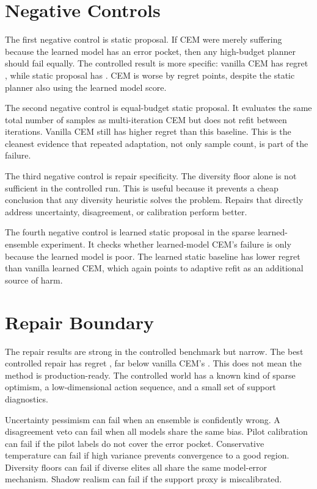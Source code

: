 \section{Negative Controls}
\label{app:negative-controls}

The first negative control is static proposal. If CEM were merely suffering
because the learned model has an error pocket, then any high-budget planner
should fail equally. The controlled result is more specific: vanilla CEM has
regret \VFourCEMRegret{}, while static proposal has
\VFourStaticRegret{}. CEM is worse by \VFourCEMMinusStatic{} regret points,
despite the static planner also using the learned model score.

The second negative control is equal-budget static proposal. It evaluates the
same total number of samples as multi-iteration CEM but does not refit between
iterations. Vanilla CEM still has higher regret than this baseline. This is
the cleanest evidence that repeated adaptation, not only sample count, is part
of the failure.

The third negative control is repair specificity. The diversity floor alone is
not sufficient in the controlled run. This is useful because it prevents a
cheap conclusion that any diversity heuristic solves the problem. Repairs that
directly address uncertainty, disagreement, or calibration perform better.

The fourth negative control is learned static proposal in the sparse
learned-ensemble experiment. It checks whether learned-model CEM's failure is
only because the learned model is poor. The learned static baseline has lower
regret than vanilla learned CEM, which again points to adaptive refit as an
additional source of harm.

\section{Repair Boundary}
\label{app:repair-boundary}

The repair results are strong in the controlled benchmark but narrow. The best
controlled repair has regret \VFourBestRepairRegret{}, far below vanilla
CEM's \VFourCEMRegret{}. This does not mean the method is production-ready.
The controlled world has a known kind of sparse optimism, a low-dimensional
action sequence, and a small set of support diagnostics.

Uncertainty pessimism can fail when an ensemble is confidently wrong. A
disagreement veto can fail when all models share the same bias. Pilot
calibration can fail if the pilot labels do not cover the error pocket.
Conservative temperature can fail if high variance prevents convergence to a
good region. Diversity floors can fail if diverse elites all share the same
model-error mechanism. Shadow realism can fail if the support proxy is
miscalibrated.

